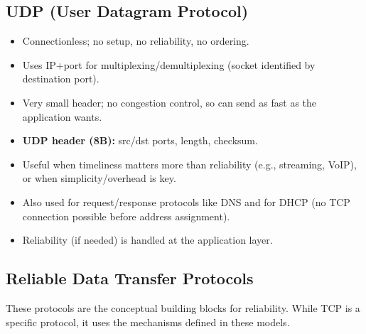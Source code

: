 \subsection{UDP (User Datagram Protocol)}
\begin{itemize}
	\item Connectionless; no setup, no reliability, no ordering.
	\item Uses IP+port for multiplexing/demultiplexing (socket identified by destination port).
	\item Very small header; no congestion control, so can send as fast as the application wants.
	\item \textbf{UDP header (8B):} src/dst ports, length, checksum.
	\item Useful when timeliness matters more than reliability (e.g., streaming, VoIP), or when simplicity/overhead is key.
	\item Also used for request/response protocols like DNS and for DHCP (no TCP connection possible before address assignment).
	\item Reliability (if needed) is handled at the application layer.
\end{itemize}

\subsection{Reliable Data Transfer Protocols}
These protocols are the conceptual building blocks for reliability. While TCP is a specific protocol, it uses the mechanisms defined in these models.

